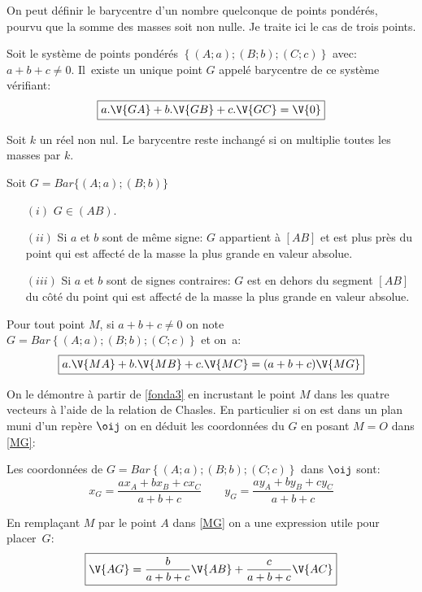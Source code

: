 \documentclass[a4paper]{article}
\begin{document}
\chead{}
\cfoot{}
\rhead{}

On peut d\'efinir le barycentre d'un nombre quelconque de points
pond\'er\'es, pourvu que la somme des masses soit non nulle. Je traite ici
le cas de trois points.
 \begin{Def}
Soit le syst\`eme de points pond\'er\'es $\left\{(A;a);(B;b);(C;c)\right\}$ avec:
$a+b+c\neq 0$. Il~existe un unique point $G$ appel\'e barycentre de ce syst\`eme v\'erifiant:
  \begin{equation} \label{fonda3}
  \boxed{ a.\V{GA}+b.\V{GB}+c.\V{GC}=\V{0}}
  \end{equation}
 \end{Def}
\begin{prop}
 Soit $k$ un r\'eel non nul. Le barycentre reste inchang\'e si on multiplie toutes les masses par $k$. 
\end{prop}
\begin{prop}
Soit $ G=Bar\{(A;a);(B;b)\}$
\begin{itemize}
\item[$(i)$] $G\in (AB)$. 
\item[$(ii)$] Si $a$ et $b$ sont de m\^eme signe: $G$ appartient \`a $[AB]$ et est plus pr\`es du point qui est affect\'e de la masse la plus grande en valeur absolue. 
\item[$(iii)$] Si $a$ et $b$ sont de signes contraires: $G$ est en dehors du segment $[AB]$ du c\^ot\'e du point qui est affect\'e de la masse la plus grande en valeur absolue.
\end{itemize}
\end{prop}
 \begin{prop}
   Pour tout point $M$, si $a+b+c\neq0$ on note $G=Bar\left\{(A;a);(B;b);(C;c)\right\}$ et on~a:
\begin{equation} \label{MG}
  \boxed{ a.\V{MA}+b.\V{MB}+c.\V{MC}=(a+b+c)\V{MG}}
  \end{equation}
 \end{prop}
On le d\'emontre \`a partir de \eqref{fonda3} en incrustant le point $M$ dans les quatre vecteurs \`a l'aide de la relation de Chasles. En particulier si on est dans un plan muni d'un rep\`ere $\oij$ on en d\'eduit les coordonn\'ees du $G$ en posant $M=O$ dans \eqref{MG}:
\begin{prop}
   Les coordonn\'ees de $G=Bar\left\{(A;a);(B;b);(C;c)\right\}$ dans $\oij$ sont:
\[ \boxed{ x_G=\frac{ax_A+bx_B+cx_C}{a+b+c} \qquad y_G=\frac{ay_A+by_B+cy_C}{a+b+c}} \]
 \end{prop}
En rempla\c{c}ant $M$ par le point $A$ dans \eqref{MG} on a une expression
utile pour placer~$G$:
\[  \boxed{\V{AG}=\frac{b}{a+b+c}\V{AB} + \frac{c}{a+b+c}\V{AC} }\]
\end{document}
